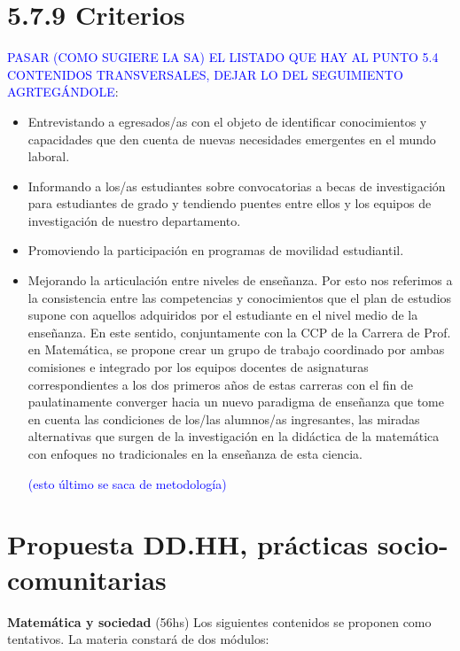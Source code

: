 \documentclass[a4paper, 12pt]{article}
\begin{document}
\section*{5.7.9 Criterios}  

\textcolor{blue}{ PASAR (COMO SUGIERE LA SA) EL LISTADO QUE HAY AL PUNTO 5.4 CONTENIDOS TRANSVERSALES, DEJAR LO DEL SEGUIMIENTO AGRTEGÁNDOLE}:

\begin{itemize}

\item Entrevistando a egresados/as con el objeto de identificar conocimientos  y capacidades que den cuenta de nuevas  necesidades  emergentes en el mundo laboral.

\item Informando a los/as  estudiantes sobre convocatorias a becas de investigación para estudiantes de grado y tendiendo puentes entre ellos y los equipos de investigación de nuestro departamento. 

\item Promoviendo la participación en programas de movilidad estudiantil. 

\item Mejorando la articulación entre niveles de enseñanza. Por esto nos referimos a la consistencia entre  las competencias y conocimientos que el plan de estudios supone con aquellos   adquiridos por el estudiante en el  nivel medio de  la enseñanza. En este sentido, conjuntamente con la CCP de la Carrera de Prof. en Matemática, se propone crear un grupo de trabajo coordinado por ambas comisiones e integrado por los equipos docentes de asignaturas correspondientes a los dos primeros años de estas carreras con el fin de paulatinamente converger hacia un nuevo paradigma de enseñanza que tome en cuenta las condiciones de los/las alumnos/as ingresantes, las  miradas alternativas que surgen de la investigación en la didáctica de la matemática con enfoques no tradicionales en la enseñanza  de esta ciencia. 

\textcolor{blue}{(esto último se saca de  metodología)}

\end{itemize}


\section*{Propuesta DD.HH, prácticas socio-comunitarias}



\noindent\textbf{Matemática y sociedad} (56hs) Los siguientes contenidos se proponen como tentativos. La materia constará de dos módulos:
\end{document}
